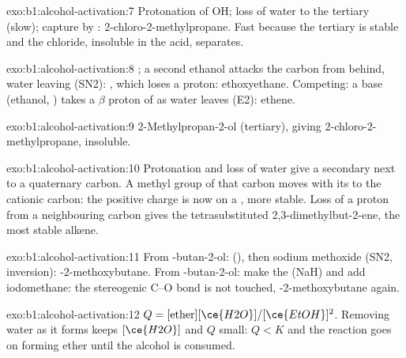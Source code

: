 \begin{solution}{exo:b1:alcohol-activation:7}
Protonation of OH; loss of water to the tertiary  (slow);
capture by : 2-chloro-2-methylpropane. Fast because the tertiary
 is stable and the chloride, insoluble in the acid, separates.
\end{solution}

\begin{solution}{exo:b1:alcohol-activation:8}
; a second ethanol attacks the carbon
from behind, water leaving (SN2): , which loses a proton:
ethoxyethane. Competing: a base (ethanol, ) takes a $\beta$
proton of  as water leaves (E2): ethene.
\end{solution}

\begin{solution}{exo:b1:alcohol-activation:9}
2-Methylpropan-2-ol (tertiary), giving 2-chloro-2-methylpropane, insoluble.
\end{solution}

\begin{solution}{exo:b1:alcohol-activation:10}
Protonation and loss of water give a secondary  next to a
quaternary carbon. A methyl group of that carbon moves with its  to the cationic carbon: the positive charge is now on a , more stable. Loss of a proton from a neighbouring carbon gives the
tetrasubstituted 2,3-dimethylbut-2-ene, the most stable alkene.
\end{solution}

\begin{solution}{exo:b1:alcohol-activation:11}
From -butan-2-ol:  (), then sodium methoxide (SN2,
inversion): -2-methoxybutane. From -butan-2-ol: make the
 (NaH) and add iodomethane: the stereogenic C--O bond is not
touched, -2-methoxybutane again.
\end{solution}

\begin{solution}{exo:b1:alcohol-activation:12}
$Q = [\text{ether}][\ce{H2O}]/[\ce{EtOH}]^2$. Removing water as it forms
keeps $[\ce{H2O}]$ and $Q$ small: $Q < K$ and the reaction goes on forming
ether until the alcohol is consumed.
\end{solution}

